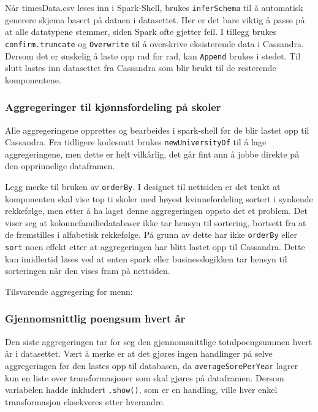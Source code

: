 
Når timesData.csv leses inn i Spark-Shell, brukes \lstinline{inferSchema} til å automatisk generere skjema basert på dataen i datasettet. Her er det bare viktig å passe på at alle datatypene stemmer, siden Spark ofte gjetter feil. I tillegg brukes \lstinline{confirm.truncate} og \lstinline{Overwrite} til å overskrive eksisterende data i Cassandra. Dersom det er ønskelig å laste opp rad for rad, kan \lstinline{Append} brukes i stedet. Til slutt lastes inn datasettet fra Cassandra som blir brukt til de resterende komponentene.

\subsubsection{Aggregeringer til kjønnsfordeling på skoler}
Alle aggregeringene opprettes og bearbeides i spark-shell før de blir lastet opp til Cassandra. Fra tidligere kodesnutt brukes \lstinline{newUniversityDf} til å lage aggregeringene, men dette er helt vilkårlig, det går fint ann å jobbe direkte på den opprinnelige dataframen.

Legg merke til bruken av \lstinline{orderBy}. I designet til nettsiden er det tenkt at komponenten skal vise top ti skoler med høyest kvinnefordeling sortert i synkende rekkefølge, men etter å ha laget denne aggregeringen oppsto det et problem. Det viser seg at kolonnefamiliedatabaser ikke tar hensyn til sortering, bortsett fra at de fremstilles i alfabetisk rekkefølge. På grunn av dette har ikke \lstinline{orderBy} eller \lstinline{sort} noen effekt etter at aggregeringen har blitt lastet opp til Cassandra. Dette kan imidlertid løses ved at enten spark eller businesslogikken tar hensyn til sorteringen når den vises fram på nettsiden.


Tilsvarende aggregering for menn:


\subsubsection{Gjennomsnittlig poengsum hvert år}
Den siste aggregeringen tar for seg den gjennomsnittlige totalpoengsummen hvert år i datasettet. Vært å merke er at det gjøres ingen handlinger på selve aggregeringen før den lastes opp til databasen, da \lstinline{averageSorePerYear} lagrer kun en liste over transformasjoner som skal gjøres på dataframen. Dersom variabelen hadde inkludert \lstinline{.show()}, som er en handling, ville hver enkel transformasjon eksekveres etter hverandre.

